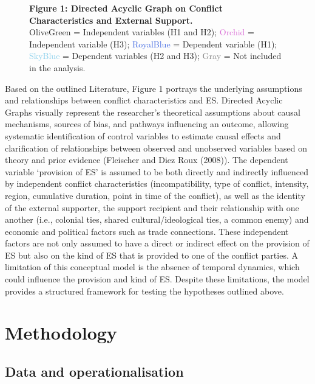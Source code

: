 \documentclass[
]{article}
\begin{document}
\begin{landscape}
\begin{figure}[htbp!]
\captionsetup{justification=raggedright, singlelinecheck=false}
\caption{
\textbf{Figure 1: Directed Acyclic Graph on Conflict Characteristics and External Support.}\\
\textcolor{OliveGreen}{OliveGreen} = Independent variables (H1 and H2); 
\textcolor{Orchid}{Orchid} = Independent variable (H3); 
\textcolor{RoyalBlue}{RoyalBlue} = Dependent variable (H1); 
\textcolor{SkyBlue}{SkyBlue} = Dependent variables (H2 and H3); 
\textcolor{Gray}{Gray} = Not included in the analysis.
}

\end{figure}
\end{landscape}

Based on the outlined Literature, Figure 1 portrays the underlying
assumptions and relationships between conflict characteristics and ES.
Directed Acyclic Graphs visually represent the researcher's theoretical
assumptions about causal mechanisms, sources of bias, and pathways
influencing an outcome, allowing systematic identification of control
variables to estimate causal effects and clarification of relationships
between observed and unobserved variables based on theory and prior
evidence (Fleischer and Diez Roux (2008)). The dependent variable
`provision of ES' is assumed to be both directly and indirectly
influenced by independent conflict characteristics (incompatibility,
type of conflict, intensity, region, cumulative duration, point in time
of the conflict), as well as the identity of the external supporter, the
support recipient and their relationship with one another (i.e.,
colonial ties, shared cultural/ideological ties, a common enemy) and
economic and political factors such as trade connections. These
independent factors are not only assumed to have a direct or indirect
effect on the provision of ES but also on the kind of ES that is
provided to one of the conflict parties. A limitation of this conceptual
model is the absence of temporal dynamics, which could influence the
provision and kind of ES. Despite these limitations, the model provides
a structured framework for testing the hypotheses outlined above.

\section{Methodology}\label{methodology}

\subsection{Data and
operationalisation}\label{data-and-operationalisation}
\end{document}
